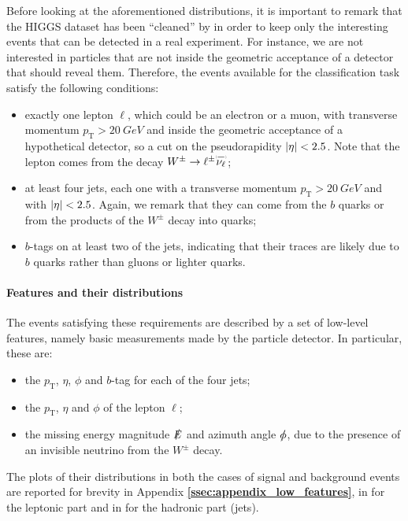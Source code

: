 \documentclass[../main/main.tex]{subfiles}
\begin{document}
Before looking at the aforementioned distributions, it is important to remark that the HIGGS dataset has been ``cleaned'' by \cite{baldi} in order to keep only the interesting events that can be detected in a real experiment. For instance, we are not interested in particles that are not inside the geometric acceptance of a detector that should reveal them. Therefore, the events available for the classification task satisfy the following conditions:
\begin{itemize}
    \item exactly one lepton \( \ell \), which could be an electron or a muon, with transverse momentum \( p_{\text{T}} > 20 \ \si{GeV} \) and inside the geometric acceptance of a hypothetical detector, so a cut on the pseudorapidity \( \abs{\eta} < 2.5 \). Note that the lepton comes from the decay \( W^{\pm} \to \ell^{\pm}\overset{\brabarb}{\nu_{\ell}} \);
    \item at least four jets, each one with a transverse momentum \( p_{\text{T}} > 20 \ \si{GeV} \) and with \( \abs{\eta} < 2.5 \). Again, we remark that they can come from the \( b \) quarks or from the products of the \( W^{\pm} \) decay into quarks;
    \item \( b \)-tags on at least two of the jets, indicating that their traces are likely due to \( b \) quarks rather than gluons or lighter quarks.
\end{itemize}


\paragraph{Features and their distributions}
The events satisfying these requirements are described by a set of low-level features, namely basic measurements made by the particle detector. In particular, these are:
\begin{itemize}
    \item the \( p_{\text{T}} \), \( \eta \), \( \phi \) and \( b \)-tag for each of the four jets;
    \item the \( p_{\text{T}} \), \( \eta \) and \( \phi \) of the lepton \( \ell \);
    \item the missing energy magnitude \( \slashed{E} \) and azimuth angle \( \slashed{\phi} \), due to the presence of an invisible neutrino from the \( W^{\pm} \) decay.
\end{itemize}
The plots of their distributions in both the cases of signal and background events are reported for brevity in Appendix \textbf{\ref{ssec:appendix_low_features}}, in  for the leptonic part and in  for the hadronic part (jets).
\end{document}

